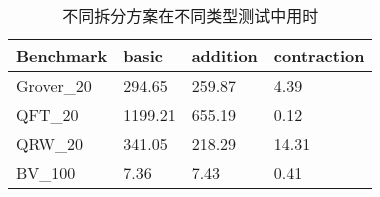 \begin{table}[!htbp]
	\centering
	\begin{tabular}{@{}llll@{}}
	\toprule
	Benchmark  & basic   & addition & contraction \\ \midrule
	Grover\_20 & 294.65  & 259.87   & 4.39        \\
	QFT\_20    & 1199.21 & 655.19   & 0.12        \\
	QRW\_20    & 341.05  & 218.29   & 14.31       \\
	BV\_100    & 7.36    & 7.43     & 0.41        \\ \bottomrule
	\end{tabular}
	\caption{不同拆分方案在不同类型测试中用时}
	\label{table:split}
\end{table}

